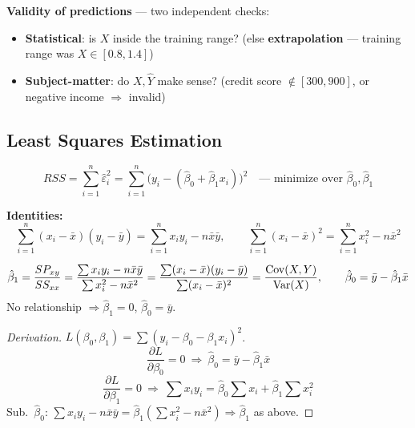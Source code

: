 \textbf{Validity of predictions} --- two independent checks:
\begin{itemize}
    \item \textbf{Statistical}: is $X$ inside the training range? (else
    \textbf{extrapolation} --- training range was $X\in[0.8,1.4]$)
    \item \textbf{Subject-matter}: do $X,\hat Y$ make sense? (credit score
    $\notin[300,900]$, or negative income $\Rightarrow$ invalid)
\end{itemize}

\subsection{Least Squares Estimation}

\[RSS = \sum_{i=1}^n \hat\varepsilon_i^2 = \sum_{i=1}^n \big(y_i-(\hat\beta_0+\hat\beta_1x_i)\big)^2 \quad\text{--- minimize over } \hat\beta_0,\hat\beta_1\]


\textbf{Identities:}
\[\sum_{i=1}^n (x_i-\bar x)(y_i-\bar y) = \sum_{i=1}^n x_iy_i - n\bar x\bar y, \qquad \sum_{i=1}^n (x_i-\bar x)^2 = \sum_{i=1}^n x_i^2 - n\bar x^2\]

\begin{proposition}[LS Estimators]\label{prop:lse}
    \[\hat\beta_1 = \frac{SP_{xy}}{SS_{xx}} = \frac{\sum x_iy_i - n\bar x\bar y}{\sum x_i^2 - n\bar x^2} = \frac{\sum (x_i-\bar x)(y_i-\bar y)}{\sum (x_i-\bar x)^2} = \frac{\operatorname{Cov}(X,Y)}{\operatorname{Var}(X)}, \qquad \hat\beta_0 = \bar y - \hat\beta_1 \bar x\]
     No relationship $\Rightarrow \hat\beta_1=0$,
    $\hat\beta_0=\bar y$.
\end{proposition}
\begin{proof}[Derivation]
    $L(\beta_0,\beta_1)=\sum(y_i-\beta_0-\beta_1x_i)^2$.
    \[\frac{\partial L}{\partial\beta_0}=0 \ \Rightarrow\ \hat\beta_0=\bar y-\hat\beta_1\bar x\]
    \[\frac{\partial L}{\partial\beta_1}=0 \ \Rightarrow\ \sum x_iy_i=\hat\beta_0\sum x_i+\hat\beta_1\sum x_i^2\]
    Sub.\ $\hat\beta_0$: $\sum x_iy_i - n\bar x\bar y = \hat\beta_1(\sum x_i^2-n\bar x^2) \Rightarrow \hat\beta_1$ as above.
\end{proof}


